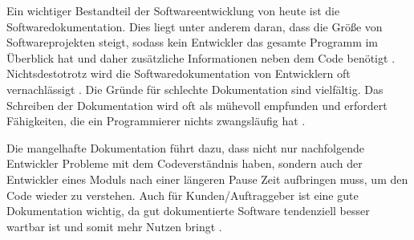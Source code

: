 \label{sec:introduction}

Ein wichtiger Bestandteil der Softwareentwicklung von heute ist die Softwaredokumentation. Dies liegt unter anderem daran, dass die Größe von Softwareprojekten steigt, sodass kein Entwickler das gesamte Programm im Überblick hat und daher zusätzliche Informationen neben dem Code benötigt \cite[S. 1]{StaticAnalysis:AnIntroduction:TheFundamentalChallengeofSoftwareEngineeringisOneofComplexity.}. Nichtsdestotrotz wird die Softwaredokumentation von Entwicklern oft vernachlässigt \cite[S. 83]{Qualityanalysisofsourcecodecomments}.  Die Gründe für schlechte Dokumentation sind vielfältig. Das Schreiben der Dokumentation wird oft als mühevoll empfunden und erfordert Fähigkeiten, die ein Programmierer nichts zwangsläufig hat\cite[S. 70]{AutomaticQualityAssessmentofSourceCodeComments:TheJavadocMiner} \cite[S. 593]{Softwareengineeringandsoftwaredocumentation:aunifiedlongcourse}.  

Die mangelhafte Dokumentation führt dazu, dass nicht nur nachfolgende Entwickler Probleme mit dem Codeverständnis haben, sondern auch der Entwickler eines Moduls nach einer längeren Pause Zeit aufbringen muss, um den Code wieder zu verstehen. Auch für Kunden/Auftraggeber ist eine gute Dokumentation wichtig, da gut dokumentierte Software tendenziell besser wartbar ist und somit mehr Nutzen bringt \cite[S. 83]{Qualityanalysisofsourcecodecomments}\cite[S. 1]{SoftwareDocumentationManagementIssuesandPractices:ASurvey}.




